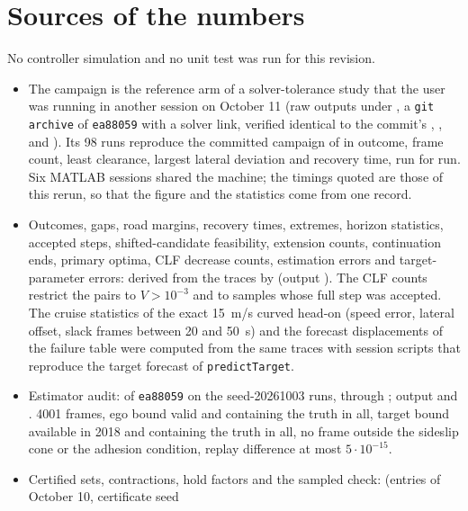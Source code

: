 \documentclass[11pt]{article}
\begin{document}
\section{Sources of the numbers}
No controller simulation and no unit test was run for this revision.
\begin{itemize}
\item The campaign is the reference arm of a solver-tolerance study that the
  user was running in another session on October 11 (raw outputs under
  , a
  \texttt{git archive} of \texttt{ea88059} with a solver link, verified
  identical to the commit's , , 
  and ). Its 98 runs reproduce the committed campaign of
   in outcome, frame count,
  least clearance, largest lateral deviation and recovery time, run for run.
  Six MATLAB sessions shared the machine; the timings quoted are those of
  this rerun, so that the figure and the statistics come from one record.
\item Outcomes, gaps, road margins, recovery times, extremes, horizon
  statistics, accepted steps, shifted-candidate feasibility, extension
  counts, continuation ends, primary optima, CLF decrease counts, estimation
  errors and target-parameter errors: derived from the traces by
  (output ). The CLF counts restrict the
  pairs to $V>10^{-3}$ and to samples whose full step was accepted. The
  cruise statistics of the exact 15~m/s curved head-on (speed error, lateral
  offset, slack frames between 20 and 50~s) and the forecast displacements of
  the failure table were computed from the same traces with session scripts
  that reproduce the target forecast of \texttt{predictTarget}.
\item Estimator audit:  of
  \texttt{ea88059} on the seed-20261003 runs, through
  ; output
   and . 4001 frames, ego
  bound valid and containing the truth in all, target bound available in
  2018 and containing the truth in all, no frame outside the sideslip cone or
  the adhesion condition, replay difference at most $5\cdot10^{-15}$.
\item Certified sets, contractions, hold factors and the sampled check:
   (entries of October 10, certificate seed

\end{itemize}
\end{document}
